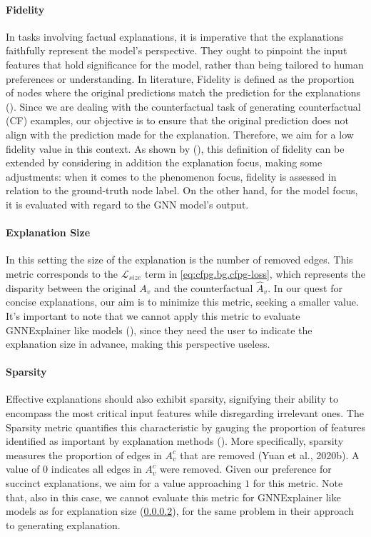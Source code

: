\documentclass[binding=0.6cm]{sapthesis}
\newcommand{\mycite}[1]{(\cite{#1})}
\begin{document}
\paragraph{Fidelity} 
\label{sec:expRes.fidelity}
In tasks involving factual explanations, it is imperative that the explanations faithfully represent the model's perspective. They ought to pinpoint the input features that hold significance for the model, rather than being tailored to human preferences or understanding.
In literature, Fidelity is defined as the proportion of nodes where the original predictions match the prediction for the explanations (\cite{molnar2022,ribeiro2016-lime}). Since we are dealing with the counterfactual task of generating counterfactual (CF) examples, our objective is to ensure that the original prediction does not align with the prediction made for the explanation. Therefore, we aim for a low fidelity value in this context. As shown by \mycite{amara2022-graphFramEx}, this definition of fidelity can be extended by considering in addition the explanation focus, making some adjustments: when it comes to the phenomenon focus, fidelity is assessed in relation to the ground-truth node label. On the other hand, for the model focus, it is evaluated with regard to the GNN model's output.


\paragraph{Explanation Size}
\label{sec:expRes.expl-size}
In this setting the size of the explanation is the number of removed edges. This metric corresponds to the $\mathcal{L}_{size}$ term in \cref{eq:cfpg.bg.cfpg-loss}, which represents the disparity between the original $A_v$ and the counterfactual $\hat{A}_v$. In our quest for concise explanations, our aim is to minimize this metric, seeking a smaller value. It's important to note that we cannot apply this metric to evaluate GNNExplainer like models (\cite{luo2020-pgexplainer,yuan2020-xgnn,vu2020-pgm-explainer,bajaj2022-robustCF}), since they need the user to indicate the explanation size in advance, making this perspective useless.


\paragraph{Sparsity}
\label{sec:expRes.sparsity}
Effective explanations should also exhibit sparsity, signifying their ability to encompass the most critical input features while disregarding irrelevant ones. The Sparsity metric quantifies this characteristic by gauging the proportion of features identified as important by explanation methods \mycite{pope2019-CVPR}.
More specifically, sparsity measures the proportion of edges in $A^c_v$ that are removed (Yuan et al., 2020b). A value of $0$ indicates all edges in $A^c_v$ were removed. Given our preference for succinct explanations, we aim for a value approaching $1$ for this metric. Note that, also in this case, we cannot evaluate this metric for GNNExplainer like models as for explanation size (\cref{sec:expRes.expl-size}), for the same problem in their approach to generating explanation.
\end{document}

